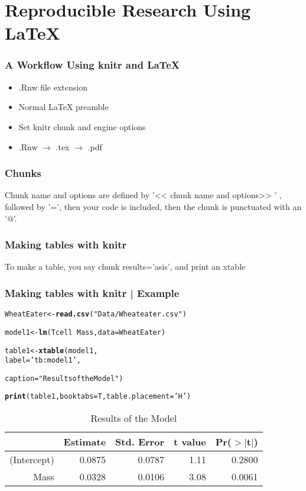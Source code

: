\documentclass{beamer}\usepackage[]{graphicx}\usepackage[]{color}
\makeatletter
\newcommand{\hlstr}[1]{\textcolor[rgb]{0.192,0.494,0.8}{#1}}%
\newcommand{\hlopt}[1]{\textcolor[rgb]{0,0,0}{#1}}%
\newcommand{\hlstd}[1]{\textcolor[rgb]{0.345,0.345,0.345}{#1}}%
\newcommand{\hlkwb}[1]{\textcolor[rgb]{0.69,0.353,0.396}{#1}}%
\newcommand{\hlkwc}[1]{\textcolor[rgb]{0.333,0.667,0.333}{#1}}%
\newcommand{\hlkwd}[1]{\textcolor[rgb]{0.737,0.353,0.396}{\textbf{#1}}}%
\newenvironment{kframe}{%
 \def\at@end@of@kframe{}%
 \ifinner\ifhmode%
  \def\at@end@of@kframe{\end{minipage}}%
  \begin{minipage}{\columnwidth}%
 \fi\fi%
 \def\FrameCommand##1{\hskip\@totalleftmargin \hskip-\fboxsep
 \colorbox{shadecolor}{##1}\hskip-\fboxsep
     \hskip-\linewidth \hskip-\@totalleftmargin \hskip\columnwidth}%
 \MakeFramed {\advance\hsize-\width
   \@totalleftmargin\z@ \linewidth\hsize
   \@setminipage}}%
 {\par\unskip\endMakeFramed%
 \at@end@of@kframe}
\makeatother
\begin{document}
	\section{Reproducible Research Using \LaTeX}
		\begin{frame}
			\frametitle{A Workflow Using knitr and \LaTeX}
			\begin{itemize}[<+->]
				\item .Rnw file extension
				\item Normal LaTeX preamble
				\item Set knitr chunk and engine options
				\item .Rnw $\rightarrow$ .tex $\rightarrow$ .pdf
			\end{itemize}
		\end{frame}
\begin{frame}
\frametitle{Chunks}
Chunk name and options are defined by '<< chunk name and options>> ' , followed by '=', then your code is included, then the chunk is punctuated with an '@'.
\end{frame}
		\begin{frame}
\frametitle{Making tables with knitr}
To make a table, you say chunk results='asis', and print an xtable
\end{frame}
		\begin{frame}
\frametitle{Making tables with knitr | Example}
\begin{kframe}
\begin{alltt}
\hlstd{WheatEater}\hlkwb{<-} \hlkwd{read.csv}\hlstd{(}\hlstr{"Data/Wheateater.csv"}\hlstd{)}

\hlstd{model1} \hlkwb{<-}\hlkwd{lm}\hlstd{(Tcell}\hlopt{~}\hlstd{Mass,}\hlkwc{data}\hlstd{=WheatEater)}

\hlstd{table1}\hlkwb{<-}\hlkwd{xtable}\hlstd{(model1,}
\hlkwc{label}\hlstd{=}\hlstr{'tb:model1'}\hlstd{,}

\hlkwc{caption}\hlstd{=}\hlstr{"Results of the Model"}\hlstd{)}

\hlkwd{print}\hlstd{(table1,}\hlkwc{booktabs}\hlstd{=T,}\hlkwc{table.placement}\hlstd{=}\hlstr{'H'}\hlstd{)}
\end{alltt}
\end{kframe}%
\begin{table}[H]
\centering
\begin{tabular}{rrrrr}
  \toprule
 & Estimate & Std. Error & t value & Pr($>$$|$t$|$) \\ 
  \midrule
(Intercept) & 0.0875 & 0.0787 & 1.11 & 0.2800 \\ 
  Mass & 0.0328 & 0.0106 & 3.08 & 0.0061 \\ 
   \bottomrule
\end{tabular}
\caption{Results of the Model} 
\label{tb:model1}
\end{table}

\end{frame}
\end{document}
